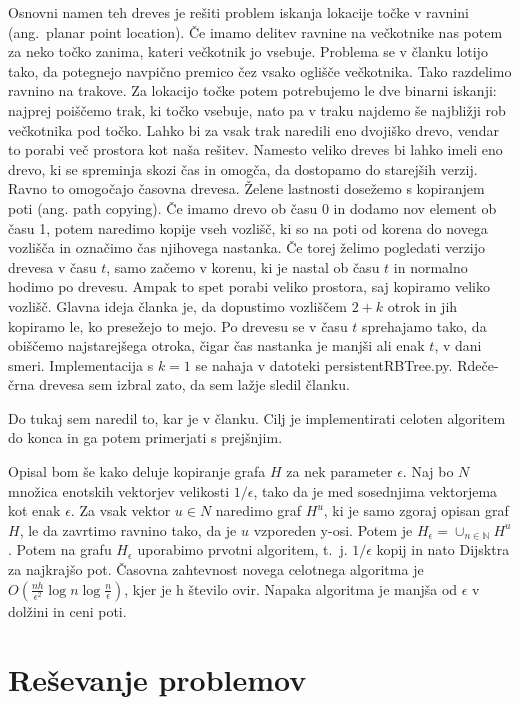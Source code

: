 \documentclass{article}
\begin{document}
Osnovni namen teh dreves je rešiti problem iskanja lokacije točke v ravnini (ang.\ planar point location). Če imamo delitev ravnine na večkotnike nas potem za neko točko zanima, kateri večkotnik jo vsebuje. Problema se v članku lotijo tako, da potegnejo navpično premico čez vsako oglišče večkotnika. Tako razdelimo ravnino na trakove. Za lokacijo točke potem potrebujemo le dve binarni iskanji: najprej poiščemo trak, ki točko vsebuje, nato pa v traku najdemo še najbližji rob večkotnika pod točko. Lahko bi za vsak trak naredili eno dvojiško drevo, vendar to porabi več prostora kot naša rešitev. Namesto veliko dreves bi lahko imeli eno drevo, ki se spreminja skozi čas in omogča, da dostopamo do starejših verzij. Ravno to omogočajo časovna drevesa. Želene lastnosti dosežemo s kopiranjem poti (ang. path copying). Če imamo drevo ob času 0 in dodamo nov element ob času 1, potem naredimo kopije vseh vozlišč, ki so na poti od korena do novega vozlišča in označimo čas njihovega nastanka. Če torej želimo pogledati verzijo drevesa v času $t$, samo začemo v korenu, ki je nastal ob času $t$ in normalno hodimo po drevesu. Ampak to spet porabi veliko prostora, saj kopiramo veliko vozlišč. Glavna ideja članka je, da dopustimo vozliščem $2 + k$ otrok in jih kopiramo le, ko presežejo to mejo. Po drevesu se v času $t$ sprehajamo tako, da obiščemo najstarejšega otroka, čigar čas nastanka je manjši ali enak $t$, v dani smeri. Implementacija s $k = 1$ se nahaja v datoteki persistentRBTree.py. Rdeče-črna drevesa sem izbral zato, da sem lažje sledil članku. 

Do tukaj sem naredil to, kar je v članku. Cilj je implementirati celoten algoritem do konca in ga potem primerjati s prejšnjim. 

Opisal bom še kako deluje kopiranje grafa $H$ za nek parameter $\epsilon$. Naj bo $N$ množica enotskih vektorjev velikosti $1/ \epsilon$, tako da je med sosednjima vektorjema kot enak $\epsilon$. Za vsak vektor $u \in N$ naredimo graf $H^u$, ki je samo zgoraj opisan graf $H$, le da zavrtimo ravnino tako, da je $u$ vzporeden y-osi. Potem je $H_\epsilon = \cup_{n \in \mathbb{N}} H^u$. Potem na grafu $H_\epsilon$ uporabimo prvotni algoritem, t.~j. $1/\epsilon$ kopij in nato Dijsktra za najkrajšo pot. Časovna zahtevnost novega celotnega algoritma je $O(\frac{nh}{\epsilon^2} \log n \log \frac{n}{\epsilon})$, kjer je h število ovir. Napaka algoritma je manjša od $\epsilon$ v dolžini in ceni poti.


\section*{Reševanje problemov}
\end{document}
